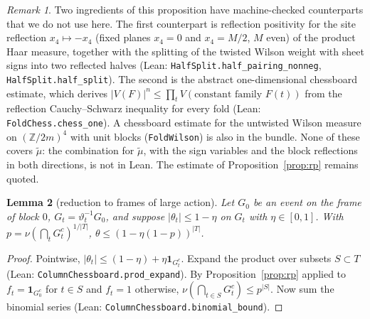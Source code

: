 \documentclass[11pt,a4paper]{article}
\newtheorem{lemma}{Lemma}[section]
\theoremstyle{definition}
\theoremstyle{remark}
\newtheorem{remark}[lemma]{Remark}
\newcommand{\code}[1]{\texttt{#1}}
\begin{document}
\begin{remark}
Two ingredients of this proposition have machine-checked counterparts that we do not use here.
The first counterpart is reflection positivity for the site reflection $x_4\mapsto-x_4$ (fixed planes $x_4=0$ and $x_4=M/2$, $M$ even) of the product Haar measure, together with the splitting of the twisted Wilson weight with sheet signs into two reflected halves (Lean: \code{HalfSplit.half\_pairing\_nonneg}, \code{HalfSplit.half\_split}).
The second is the abstract one-dimensional chessboard estimate, which derives $|V(F)|^n\le\prod_tV(\text{constant family }F(t))$ from the reflection Cauchy--Schwarz inequality for every fold (Lean: \code{FoldChess.chess\_one}).
A chessboard estimate for the untwisted Wilson measure on $(\mathbb{Z}/2m)^4$ with unit blocks (\code{FoldWilson}) is also in the bundle.
None of these covers $\tilde\mu$: the combination for $\tilde\mu$, with the sign variables and the block reflections in both directions, is not in Lean.
The estimate of Proposition~\ref{prop:rp} remains quoted.
\end{remark}

\begin{lemma}[reduction to frames of large action]\label{lem:goodbad}
Let $G_0$ be an event on the frame of block $0$, $G_t=\vartheta_t^{-1}G_0$, and suppose $|\theta_t|\le1-\eta$ on $G_t$ with $\eta\in[0,1]$. With $p=\nu(\bigcap_tG^c_t)^{1/|T|}$, $\theta\le(1-\eta(1-p))^{|T|}$.
\end{lemma}
\begin{proof}
Pointwise, $|\theta_t|\le(1-\eta)+\eta\mathbf{1}_{G_t^c}$.
Expand the product over subsets $S\subset T$ (Lean: \code{ColumnChessboard.prod\_expand}).
By Proposition~\ref{prop:rp} applied to $f_t=\mathbf{1}_{G^c_0}$ for $t\in S$ and $f_t=1$ otherwise, $\nu(\bigcap_{t\in S}G_t^c)\le p^{|S|}$.
Now sum the binomial series (Lean: \code{ColumnChessboard.\allowbreak{}binomial\_bound}).
\end{proof}
\end{document}
